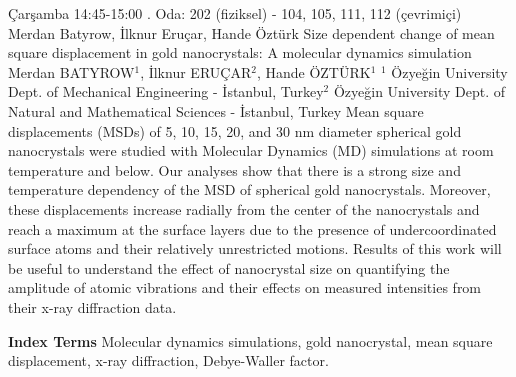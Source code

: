 
    \begin{abstract_basarim}
    {Çarşamba 14:45-15:00}
    {.}
    {Oda: 202 (fiziksel) - 104, 105, 111, 112 (çevrimiçi)}
    {Merdan Batyrow, İlknur Eruçar, Hande Öztürk}
    {Size dependent change of mean square displacement in gold nanocrystals: A molecular dynamics simulation}
    {%
    Merdan BATYROW$^{1}$, İlknur ERUÇAR$^{2}$, Hande ÖZTÜRK$^{1}$}
    {%
    }
    {%
    $^1$ Özyeğin University Dept. of Mechanical Engineering - İstanbul, Turkey\newline{}$^2$ Özyeğin University Dept. of Natural and Mathematical Sciences - İstanbul, Turkey}
    Mean square displacements (MSDs) of 5, 10, 15, 20, and 30 nm diameter spherical gold nanocrystals were studied with Molecular Dynamics (MD) simulations at room temperature and below. Our analyses show that there is a strong size and temperature dependency of the MSD of spherical gold nanocrystals. Moreover, these displacements increase radially from the center of the nanocrystals and reach a maximum at the surface layers due to the presence of undercoordinated surface atoms and their relatively unrestricted motions. Results of this work will be useful to understand the effect of nanocrystal size on quantifying the amplitude of atomic vibrations and their effects on measured intensities from their x-ray diffraction data. 
    
            \textbf{Index Terms} \newline{}Molecular dynamics simulations, gold nanocrystal, mean square displacement, x-ray diffraction, Debye-Waller factor.
    \end{abstract_basarim}
    